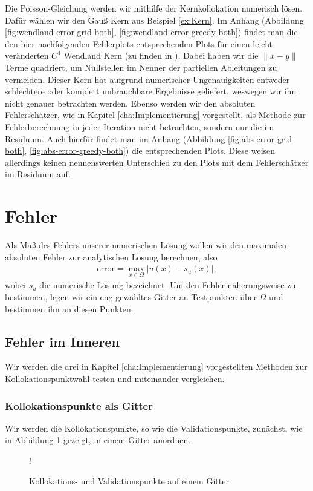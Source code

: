 Die Poisson-Gleichung werden wir mithilfe der Kernkollokation numerisch lösen. Dafür wählen wir den Gauß Kern aus Beispiel \ref{ex:Kern}. Im Anhang (Abbildung \ref{fig:wendland-error-grid-both}, \ref{fig:wendland-error-greedy-both}) findet man die den hier nachfolgenden Fehlerplots entsprechenden Plots für einen leicht veränderten $C^4$ Wendland Kern (zu finden in \textcite[Kapitel 9.4]{Wendland.2005}). Dabei haben wir die $\|x-y\|$ Terme quadriert, um Nullstellen im Nenner der partiellen Ableitungen zu vermeiden. Dieser Kern hat aufgrund numerischer Ungenauigkeiten entweder schlechtere oder komplett unbrauchbare Ergebnisse geliefert, weswegen wir ihn nicht genauer betrachten werden. Ebenso werden wir den absoluten Fehlerschätzer, wie in Kapitel \ref{cha:Implementierung} vorgestellt, als Methode zur Fehlerberechnung in jeder Iteration nicht betrachten, sondern nur die im Residuum. Auch hierfür findet man im Anhang (Abbildung \ref{fig:abs-error-grid-both}, \ref{fig:abs-error-greedy-both}) die entsprechenden Plots. Diese weisen allerdings keinen nennenswerten Unterschied zu den Plots mit dem Fehlerschätzer im Residuum auf.

\section{Fehler}

Als Maß des Fehlers unserer numerischen Lösung wollen wir den maximalen absoluten Fehler zur analytischen Lösung berechnen, also
\begin{align*}
\text{error} = \max_{x \in \Omega} |u(x) - s_u (x)|,
\end{align*}
wobei $s_u$ die numerische Lösung bezeichnet. Um den Fehler näherungsweise zu bestimmen, legen wir ein eng gewähltes Gitter an Testpunkten über $\Omega$ und bestimmen ihn an diesen Punkten.
\subsection{Fehler im Inneren}

Wir werden die drei in Kapitel \ref{cha:Implementierung} vorgestellten Methoden zur Kollokationspunktwahl testen und miteinander vergleichen. 

\subsubsection{Kollokationspunkte als Gitter}
Wir werden die Kollokationspunkte, so wie die Validationspunkte, zunächst, wie in Abbildung \ref{fig:Kollok} gezeigt, in einem Gitter anordnen.
\begin{figure}[H]
\centering
\resizebox {.6\columnwidth} {!} {

}
\caption{Kollokations- und Validationspunkte auf einem Gitter}
\label{fig:Kollok}
\end{figure}

